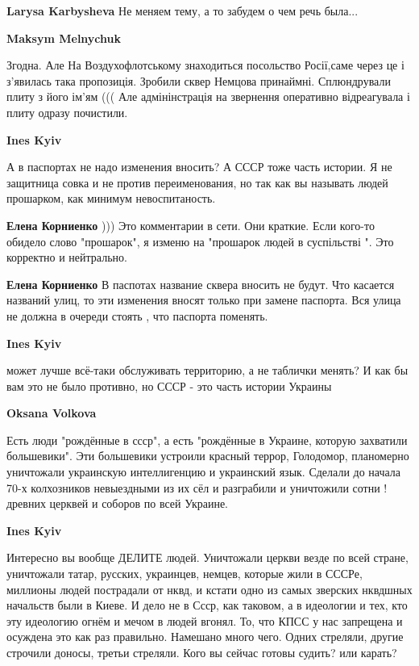 \begin{itemize}
\begin{itemize}
\begin{itemize}
\textbf{Larysa Karbysheva} Не меняем тему, а то забудем о чем речь была...

\textbf{Maksym Melnychuk} 

Згодна. Але На Воздухофлотському знаходиться посольство Росії,саме через це і
з'явилась така пропозиція. Зробили сквер Немцова принаймні. Сплюндрували плиту
з його ім'ям ((( Але адмінінстрація на звернення оперативно відреагувала і
плиту одразу почистили.

\end{itemize} %

\textbf{Ines Kyiv} 

А в паспортах не надо изменения вносить? А СССР тоже часть истории. Я не
защитница совка и не против переименования, но так как вы называть людей
прошарком, как минимум невоспитаность.

\begin{itemize} %
\textbf{Елена Корниенко} ))) Это комментарии в сети. Они краткие. Если кого-то обидело слово "прошарок", я изменю на "прошарок людей в суспільстві ". Это корректно и нейтрально.

\textbf{Елена Корниенко} В паспотах название сквера вносить не будут. Что касается названий улиц, то эти изменения вносят только при замене паспорта. Вся улица не должна в очереди стоять , что паспорта поменять.
\end{itemize} %

\textbf{Ines Kyiv} 

может лучше всё-таки обслуживать территорию, а не таблички менять? И как бы вам
это не было противно, но СССР - это часть истории Украины

\begin{itemize} %
\textbf{Oksana Volkova} 

Есть люди "рождённые в ссср", а есть "рождённые в Украине, которую захватили
большевики". Эти большевики устроили красный террор, Голодомор, планомерно
уничтожали украинскую интеллигенцию и украинский язык. Сделали до начала 70-х
колхозников невыездными из их сёл и разграбили и уничтожили сотни ! древних
церквей и соборов по всей Украине.

\textbf{Ines Kyiv} 

Интересно вы вообще ДЕЛИТЕ людей. Уничтожали церкви везде по всей
стране, уничтожали татар, русских, украинцев, немцев, которые жили в СССРе, миллионы
людей пострадали от нквд, и кстати одно из самых зверских нквдшных начальств
были в Киеве. И дело не в Ссср, как таковом, а в идеологии и тех, кто эту идеологию
огнём и мечом в людей вгонял. То, что КПСС у нас запрещена и осуждена это как раз
правильно. Намешано много чего. Одних стреляли, другие строчили доносы, третьи
стреляли. Кого вы сейчас готовы судить? или карать?


\end{itemize}
\end{itemize}
\end{itemize}
